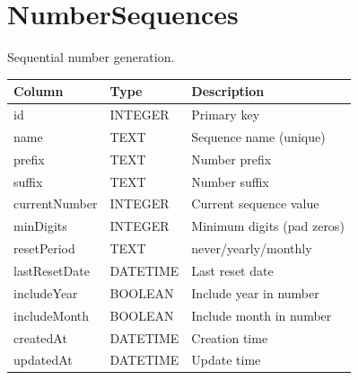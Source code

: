 \documentclass[12pt,a4paper]{report}
\begin{document}
\section{NumberSequences}

Sequential number generation.

\begin{longtable}{@{}p{4cm}p{2.5cm}p{6.5cm}@{}}
\toprule
\textbf{Column} & \textbf{Type} & \textbf{Description} \\
\midrule
\endhead
id & INTEGER & Primary key \\
name & TEXT & Sequence name (unique) \\
prefix & TEXT & Number prefix \\
suffix & TEXT & Number suffix \\
currentNumber & INTEGER & Current sequence value \\
minDigits & INTEGER & Minimum digits (pad zeros) \\
resetPeriod & TEXT & never/yearly/monthly \\
lastResetDate & DATETIME & Last reset date \\
includeYear & BOOLEAN & Include year in number \\
includeMonth & BOOLEAN & Include month in number \\
createdAt & DATETIME & Creation time \\
updatedAt & DATETIME & Update time \\
\bottomrule
\end{longtable}
\end{document}
